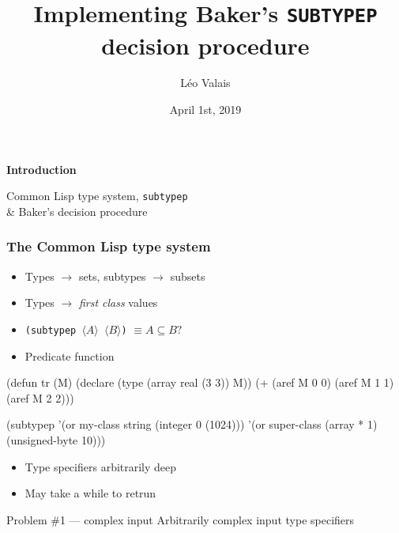 \documentclass[aspectratio=169]{beamer}
\title{Implementing Baker's \texttt{SUBTYPEP} decision procedure\vspace*{-5mm}}
\date{April 1st, 2019}
\author{Léo Valais}
\institute{European Lisp Symposium}
\renewcommand\code[1]{\texttt{#1}}
\newcommand\rarr{\ensuremath{\rightarrow}}
\newcommand\plholder[1]{\ensuremath{\langle {#1} \rangle}}
\begin{document}
\begin{frame}
\titlepage{}
\end{frame}

\newenvironment{sectionframe}[1]{%
  \begin{frame}[standout]
    \centering
    \Huge
    {\bf #1}

    {\usebeamercolor[bg]{secondary color}\noindent\sout{\hfill}}
    \bigskip

    \large
  }{\end{frame}}

\begin{sectionframe}{Introduction}
  Common Lisp type system, \code{subtypep} \\\& Baker's decision procedure
\end{sectionframe}

\begin{frame}[fragile]
  \frametitle{The Common Lisp type system}
  \begin{itemize}
  \item Types \rarr{} sets, subtypes \rarr{} subsets
  \item<3-> Types \rarr{} \emph{first class} values
  \end{itemize}

  \begin{itemize}
  \item<4-> \code{(subtypep \plholder A \plholder B)} $\equiv A \subseteq B?$
  \item<4-> Predicate function
  \end{itemize}

  \pause
  \medskip

  \begin{overprint}
\begin{clcode}
(defun tr (M)
  (declare (type (array real (3 3)) M))
  (+ (aref M 0 0)
     (aref M 1 1)
     (aref M 2 2)))
\end{clcode}

\begin{clcode}
(subtypep '(or my-class string (integer 0 (1024)))
          '(or super-class
               (array * 1)
               (unsigned-byte 10)))
\end{clcode}
  \end{overprint}

  \begin{popup}{.75}
    \begin{macosbox}{}
      \begin{itemize}
      \item Type specifiers arbitrarily deep
      \item May take a while to retrun
      \end{itemize}

      \begin{alertblock}{Problem \#1 --- complex input}
        Arbitrarily complex input type specifiers
      \end{alertblock}
    \end{macosbox}
  \end{popup}
\end{frame}
\end{document}
